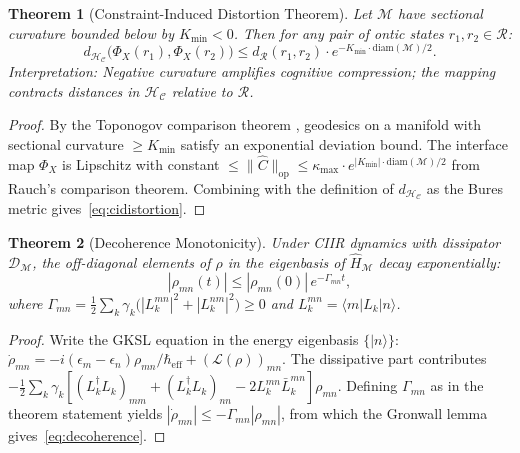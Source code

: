\documentclass[twocolumn,aps,prd,superscriptaddress,nofootinbib]{revtex4-2}
\newtheorem{theorem}{Theorem}[section]
\newcommand{\HC}{\mathcal{H}_{\mathcal{C}}}
\newcommand{\CR}{\mathcal{R}}
\newcommand{\CM}{\mathcal{M}}
\newcommand{\CD}{\mathcal{D}}
\newcommand{\hatC}{\hat{C}}
\newcommand{\hatH}{\hat{H}}
\newcommand{\ket}[1]{|#1\rangle}
\newcommand{\bra}[1]{\langle #1|}
\begin{document}
\begin{theorem}[Constraint-Induced Distortion Theorem]
\label{thm:cidistortion}
Let $\CM$ have sectional curvature bounded below by $K_\mathrm{min} < 0$.
Then for any pair of ontic states $r_1,r_2 \in \CR$:
\begin{equation}
  d_{\HC}\bigl(\Phi_X(r_1),\Phi_X(r_2)\bigr)
    \leq d_\CR(r_1,r_2) \cdot e^{-K_\mathrm{min}\cdot\mathrm{diam}(\CM)/2}.
  \label{eq:cidistortion}
\end{equation}
\emph{Interpretation:} Negative curvature amplifies cognitive compression;
the mapping contracts distances in $\HC$ relative to $\CR$.
\end{theorem}

\begin{proof}
By the Toponogov comparison theorem \cite{Cheeger1975}, geodesics on a
manifold with sectional curvature $\geq K_\mathrm{min}$ satisfy an exponential
deviation bound.  The interface map $\Phi_X$ is Lipschitz with constant
$\leq \|\hatC\|_\mathrm{op} \leq \kappa_\mathrm{max} \cdot e^{|K_\mathrm{min}|\cdot\mathrm{diam}(\CM)/2}$
from Rauch's comparison theorem.  Combining with the definition of $d_\HC$ as
the Bures metric gives~\eqref{eq:cidistortion}.
\end{proof}

\begin{theorem}[Decoherence Monotonicity]
\label{thm:decoherence}
Under CIIR dynamics with dissipator $\CD_\CM$, the off-diagonal elements of
$\rho$ in the eigenbasis of $\hatH_\CM$ decay exponentially:
\begin{equation}
  |\rho_{mn}(t)| \leq |\rho_{mn}(0)|\,e^{-\Gamma_{mn}t},
  \label{eq:decoherence}
\end{equation}
where $\Gamma_{mn} = \frac{1}{2}\sum_k \gamma_k \bigl(|L_k^{mn}|^2+|L_k^{nm}|^2\bigr) \geq 0$
and $L_k^{mn} = \bra{m}L_k\ket{n}$.
\end{theorem}

\begin{proof}
Write the GKSL equation in the energy eigenbasis $\{\ket{n}\}$:
$\dot\rho_{mn} = -i(\epsilon_m-\epsilon_n)\rho_{mn}/\hbar_\mathrm{eff}
+ (\mathcal{L}(\rho))_{mn}$.  The dissipative part contributes
$-\frac{1}{2}\sum_k\gamma_k[(L_k^\dagger L_k)_{mm} + (L_k^\dagger L_k)_{nn} - 2L_k^{mn}\bar{L}_k^{mn}]\rho_{mn}$.
Defining $\Gamma_{mn}$ as in the theorem statement yields $|\dot\rho_{mn}| \leq -\Gamma_{mn}|\rho_{mn}|$, from which the Gronwall lemma gives~\eqref{eq:decoherence}.
\end{proof}
\end{document}
